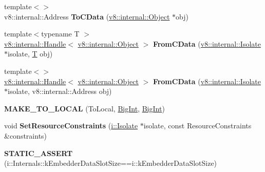 \begin{DoxyCompactItemize}
\mbox{\label{namespacev8_af44c6dae4b738eaf30b5355f3f1b6bac}} 
{\footnotesize template$<$$>$ }\\v8\+::internal\+::\+Address {\bfseries To\+C\+Data} (\mbox{\hyperlink{classv8_1_1internal_1_1Object}{v8\+::internal\+::\+Object}} $\ast$obj)
\item 
\mbox{\label{namespacev8_a58f96b7e8ad0f7068d37a80e964e1caf}} 
{\footnotesize template$<$typename T $>$ }\\\mbox{\hyperlink{classv8_1_1internal_1_1Handle}{v8\+::internal\+::\+Handle}}$<$ \mbox{\hyperlink{classv8_1_1internal_1_1Object}{v8\+::internal\+::\+Object}} $>$ {\bfseries From\+C\+Data} (\mbox{\hyperlink{classv8_1_1internal_1_1Isolate}{v8\+::internal\+::\+Isolate}} $\ast$isolate, \mbox{\hyperlink{classv8_1_1internal_1_1torque_1_1T}{T}} obj)
\item 
\mbox{\label{namespacev8_a393ed97c954a6585d99b7565da440b75}} 
{\footnotesize template$<$$>$ }\\\mbox{\hyperlink{classv8_1_1internal_1_1Handle}{v8\+::internal\+::\+Handle}}$<$ \mbox{\hyperlink{classv8_1_1internal_1_1Object}{v8\+::internal\+::\+Object}} $>$ {\bfseries From\+C\+Data} (\mbox{\hyperlink{classv8_1_1internal_1_1Isolate}{v8\+::internal\+::\+Isolate}} $\ast$isolate, v8\+::internal\+::\+Address obj)
\item 
\mbox{\label{namespacev8_aebe83dad937066bbbd26b7b011fd05a0}} 
{\bfseries M\+A\+K\+E\+\_\+\+T\+O\+\_\+\+L\+O\+C\+AL} (To\+Local, \mbox{\hyperlink{classv8_1_1BigInt}{Big\+Int}}, \mbox{\hyperlink{classv8_1_1BigInt}{Big\+Int}})
\item 
\mbox{\label{namespacev8_a43d53b7beaa27d6e70d2f7b834892630}} 
void {\bfseries Set\+Resource\+Constraints} (\mbox{\hyperlink{classv8_1_1internal_1_1Isolate}{i\+::\+Isolate}} $\ast$isolate, const Resource\+Constraints \&constraints)
\item 
\mbox{\label{namespacev8_ad78f8d64bb10047bd4ed6d2c9028817c}} 
{\bfseries S\+T\+A\+T\+I\+C\+\_\+\+A\+S\+S\+E\+RT} (i\+::\+Internals\+::k\+Embedder\+Data\+Slot\+Size==i\+::k\+Embedder\+Data\+Slot\+Size)
\item 
\mbox{\label{namespacev8_a85ae4edc8def898815720cda7770b3da}} 

\end{DoxyCompactItemize}
